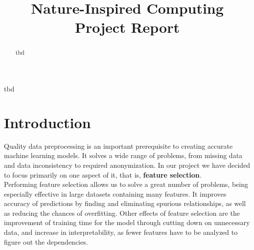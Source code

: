 \documentclass[conference]{IEEEtran}
\begin{document}
\title{Nature-Inspired Computing\\Project Report\\}

\author{
\and
{}
\and
{}
}

\maketitle

\begin{abstract}
tbd
\end{abstract}

\begin{IEEEkeywords}
tbd
\end{IEEEkeywords}

\section{Introduction}
Quality data preprocessing is an important prerequisite to creating accurate machine learning models. It solves a wide range of problems, from missing data and data inconsistency to required anonymization. In our project we have decided to focus primarily on one aspect of it, that is, \textbf{feature selection}. \\

Performing feature selection allows us to solve a great number of problems, being especially effective in large datasets containing many features. It improves accuracy of predictions by finding and eliminating spurious relationships, as well as reducing the chances of overfitting. Other effects of feature selection are the improvement of training time for the model through cutting down on unnecessary data, and increase in interpretability, as fewer features have to be analyzed to figure out the dependencies. \\
\end{document}
